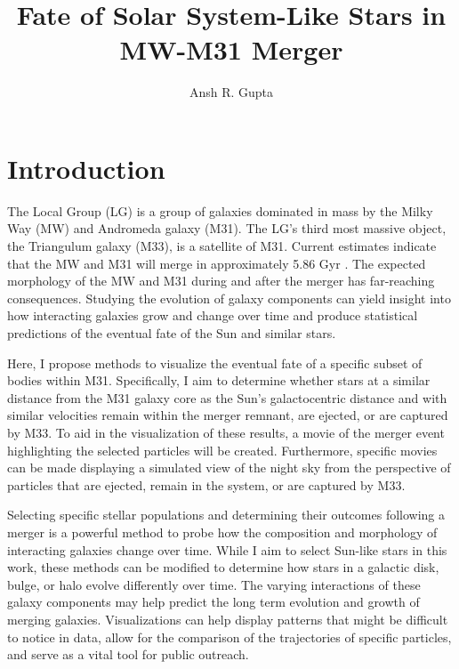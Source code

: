 \documentclass[twocolumn]{aastex631}
\begin{document}
\title{Fate of Solar System-Like Stars in MW-M31 Merger}

\author[0000-0003-4242-8606]{Ansh R. Gupta}

\section{Introduction} \label{sec:intro}

The Local Group (LG) is a group of galaxies dominated in mass by the Milky Way (MW) and Andromeda galaxy (M31). The LG's third most massive object, the Triangulum galaxy (M33), is a satellite of M31. Current estimates indicate that the MW and M31 will merge in approximately 5.86 Gyr \citep{2012ApJ...753....9V}. The expected morphology of the MW and M31 during and after the merger has far-reaching consequences. Studying the evolution of galaxy components can yield insight into how interacting galaxies grow and change over time and produce statistical predictions of the eventual fate of the Sun and similar stars.

Here, I propose methods to visualize the eventual fate of a specific subset of bodies within M31. Specifically, I aim to determine whether stars at a similar distance from the M31 galaxy core as the Sun's galactocentric distance and with similar velocities remain within the merger remnant, are ejected, or are captured by M33. To aid in the visualization of these results, a movie of the merger event highlighting the selected particles will be created. Furthermore, specific movies can be made displaying a simulated view of the night sky from the perspective of particles that are ejected, remain in the system, or are captured by M33.

Selecting specific stellar populations and determining their outcomes following a merger is a powerful method to probe how the composition and morphology of interacting galaxies change over time. While I aim to select Sun-like stars in this work, these methods can be modified to determine how stars in a galactic disk, bulge, or halo evolve differently over time. The varying interactions of these galaxy components may help predict the long term evolution and growth of merging galaxies. Visualizations can help display patterns that might be difficult to notice in data, allow for the comparison of the trajectories of specific particles, and serve as a vital tool for public outreach.
\end{document}
